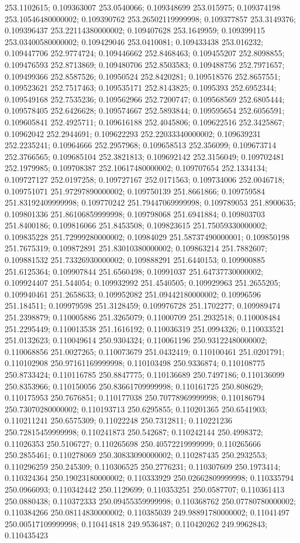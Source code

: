 253.1102615; 0.109363007 253.0540066; 0.109348699 253.015975; 0.109374198 253.10546480000002; 0.109390762 253.26502119999998; 0.109377857 253.3149376; 0.109396437 253.22114380000002; 0.109407628 253.1649959; 0.109399115 253.03400580000002; 0.109429046 253.0410081; 0.109433438 253.016232; 0.109447706 252.9774724; 0.109446662 252.8468463; 0.109455207 252.8098855; 0.109476593 252.8713869; 0.109480706 252.8503583; 0.109488756 252.7971657; 0.109499366 252.8587526; 0.10950524 252.8420281; 0.109518576 252.8657551; 0.109523621 252.7517463; 0.109535171 252.8143825; 0.1095393 252.6952344; 0.109549168 252.7535236; 0.109562966 252.7200747; 0.109568569 252.6805444; 0.109578405 252.6426628; 0.109574667 252.5893844; 0.109595654 252.6056591; 0.109605841 252.4925711; 0.109616188 252.4045806; 0.109622516 252.3425867; 0.10962042 252.2944691; 0.109622293 252.22033340000002; 0.109639231 252.2235241; 0.10964666 252.2957968; 0.109658513 252.356099; 0.109673714 252.3766565; 0.109685104 252.3821813; 0.109692142 252.3156049; 0.109702481 252.1979985; 0.109708387 252.10617480000002; 0.109707654 252.1334134; 0.109727127 252.0197258; 0.109727167 252.0171563; 0.109734006 252.0046718; 0.109751071 251.97297890000002; 0.109750139 251.8661866; 0.109759584 251.83192409999998; 0.109770242 251.79447069999998; 0.109789053 251.8900635; 0.109801336 251.86106859999998; 0.109798068 251.6941884; 0.109803703 251.8400186; 0.109816066 251.8453508; 0.109823615 251.75059330000002; 0.109835228 251.72999280000002; 0.10984029 251.58737490000001; 0.109850198 251.7675319; 0.109872891 251.83010380000002; 0.109863214 251.7882607; 0.109881532 251.73326930000002; 0.109888291 251.6440153; 0.109900885 251.6125364; 0.109907844 251.6560498; 0.10991037 251.64737730000002; 0.109924407 251.544054; 0.109932992 251.4540505; 0.109929963 251.2655205; 0.109940461 251.2658633; 0.109952082 251.09442180000002; 0.10996596 251.184511; 0.109979598 251.3128459; 0.109976728 251.1702277; 0.109989474 251.2398879; 0.110005886 251.3265079; 0.11000709 251.2932518; 0.110008484 251.2295449; 0.110013538 251.1616192; 0.110036319 251.0994326; 0.110033521 251.0132623; 0.110049614 250.9304324; 0.110061196 250.93122480000002; 0.110068856 251.0027265; 0.110073679 251.0432419; 0.110100461 251.0201791; 0.110102908 250.97161169999998; 0.110103498 250.9336874; 0.110108775 250.8733424; 0.110116785 250.8847775; 0.110136689 250.7497186; 0.110136099 250.8353966; 0.110150056 250.83661709999998; 0.110161725 250.808629; 0.110175953 250.7676851; 0.110177038 250.70778969999998; 0.110186794 250.73070280000002; 0.110193713 250.6295855; 0.110201365 250.6541903; 0.110211241 250.6575309; 0.11022248 250.7312811; 0.110221236 250.72815459999998; 0.110241873 250.542687; 0.110242144 250.4998372; 0.11026353 250.5106727; 0.110265698 250.40572219999999; 0.110265666 250.2855461; 0.110278069 250.30833090000002; 0.110287435 250.2932553; 0.110296259 250.245309; 0.110306525 250.2776231; 0.110307609 250.1973414; 0.110324364 250.19023180000002; 0.110333929 250.02662809999998; 0.110335794 250.0966093; 0.110342442 250.1129699; 0.110353251 250.0587707; 0.110361413 250.0880438; 0.110372333 250.09455359999998; 0.110368762 250.07780780000002; 0.110384266 250.08114830000002; 0.110385039 249.98891780000002; 0.11041497 250.00517109999998; 0.110414818 249.9536487; 0.110420262 249.9962843; 0.110435423 